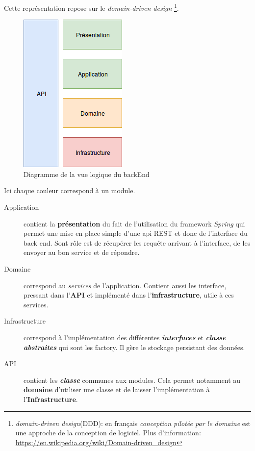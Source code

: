 \documentclass[12pt]{article}
\begin{document}
Cette représentation repose sur le \textit{domain-driven design} \footnote{\textit{domain-driven design}(DDD): en français \textit{conception pilotée par le domaine} est une approche de la conception de logiciel. Plus d'information: \url{https://en.wikipedia.org/wiki/Domain-driven_design}}.

\begin{figure}[h]
    \centering
    \includegraphics[]{img/Vue_logique_back.png}
    \caption{Diagramme de la vue logique du backEnd}
\end{figure}

Ici chaque couleur correspond à un module.


\begin{description}
    \item [Application] contient la \textbf{présentation} du fait de l'utilisation du framework \textit{Spring} qui permet une mise en place simple d'une api REST et donc de l'interface du back end. Sont rôle est de récupérer les requête arrivant à l'interface, de les envoyer au bon service et de répondre.
    \item [Domaine] correspond au \textit{services} de l'application. Contient aussi les interface, pressant  dans l'\textbf{API} et implémenté dans l'\textbf{infrastructure}, utile à ces services.
    \item [Infrastructure] correspond à l'implémentation des différentes \textbf{\textit{interfaces}} et \textbf{\textit{classe abstraites}} qui sont les factory. Il gère le stockage persistant des données.
    \item [API] contient les \textbf{\textit{classe}} communes aux modules. Cela permet notamment au \textbf{domaine} d'utiliser une classe et de laisser l'implémentation à l'\textbf{Infrastructure}.
\end{description}
\end{document}

